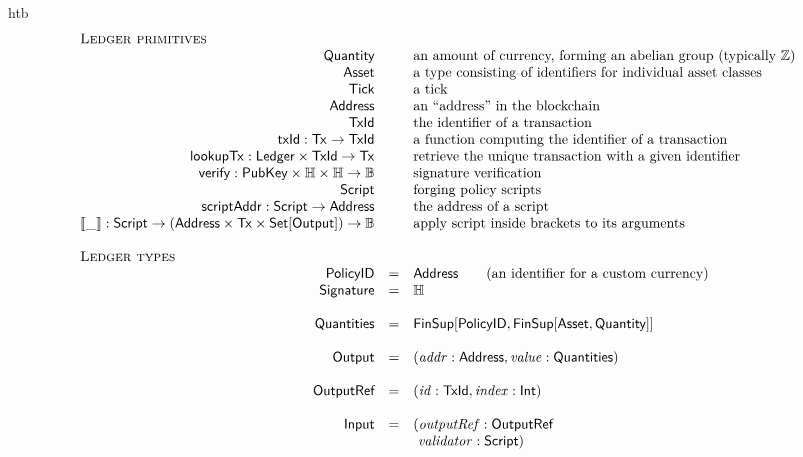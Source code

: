 %
\begin{ruledfigure}{htb}
  \begin{displaymath}
    \begin{array}{rll}
      \multicolumn{3}{l}{\textsc{Ledger primitives}}\\
      \Quantity && \mbox{an amount of currency, forming an abelian group (typically \Z{})}\\
      \Asset && \mbox{a type consisting of identifiers for individual asset classes}\\
      \Tick && \mbox{a tick}\\
      \Address && \mbox{an ``address'' in the blockchain}\\
      \TxId && \mbox{the identifier of a transaction}\\
      \txId : \utxotx \rightarrow \TxId && \mbox{a function computing the identifier of a transaction}\\
      \lookupTx : \Ledger \times \TxId \rightarrow \utxotx && \mbox{retrieve the unique transaction with a given identifier}\\
      \verify : \PublicKey\times\H\times\H \rightarrow \B && \mbox{signature verification}\\
      \FPScript && \mbox{forging policy scripts}\\
      \scriptAddr : \Script \rightarrow \Address && \mbox{the address of a script}\\
      \applyScript{\_} : \Script \to (\Address \times \utxotx \times \Set{\Output}) \to
      \B && \mbox{apply script inside brackets to its arguments}\\
    \\
    \multicolumn{3}{l}{\textsc{Ledger types}} \\
    \Policy &=& \Address \qquad \mbox{(an identifier for a custom currency)}\\
    \Signature &=& \H\\
    \\
    \Quantities   &=& \FinSup{\Policy}{\FinSup{\Asset}{\Quantity}}\\
    \\
    \Output &=& (\addr: \Address, \val: \Quantities)\\
    \\
    \OutputRef &=& (\txrefid: \TxId, \idx: \s{Int})\\
    \\
    \Input &=& ( \outputref : \OutputRef\\
             & &\ \validator: \Script)\\

\end{array}
\end{displaymath}
\end{ruledfigure}

